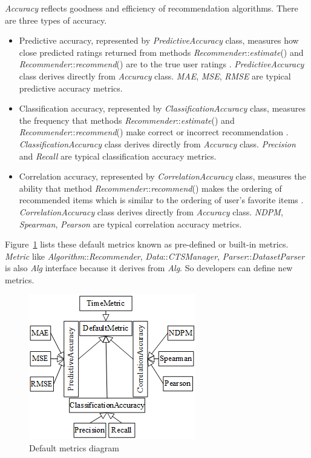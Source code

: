 \documentclass[a4paper,twoside]{article}
\begin{document}
\textit{Accuracy} reflects goodness and efficiency of recommendation algorithms. There are three types of accuracy.
\begin{itemize}
\item Predictive accuracy, represented by \textit{PredictiveAccuracy} class, measures how close predicted ratings returned from methods \textit{Recommender}::\textit{estimate}() and \textit{Recommender}::\textit{recommend}() are to the true user ratings \cite[pp. 20-21]{herlocker2004}. \textit{PredictiveAccuracy} class derives directly from \textit{Accuracy} class. \textit{MAE}, \textit{MSE}, \textit{RMSE} \cite[pp. 20-21]{herlocker2004} are typical predictive accuracy metrics.
\item Classification accuracy, represented by \textit{ClassificationAccuracy} class, measures the frequency that methods \textit{Recommender}::\textit{estimate}() and \textit{Recommender}::\textit{recommend}() make correct or incorrect recommendation \cite[pp. 20-22]{herlocker2004}. \textit{ClassificationAccuracy} class derives directly from \textit{Accuracy} class. \textit{Precision} and \textit{Recall} \cite[pp. 22-25]{herlocker2004} are typical classification accuracy metrics.
\item Correlation accuracy, represented by \textit{CorrelationAccuracy} class, measures the ability that method \textit{Recommender}::\textit{recommend}() makes the ordering of recommended items which is similar to the ordering of user's favorite items \cite[pp. 29-33]{herlocker2004}. \textit{CorrelationAccuracy} class derives directly from \textit{Accuracy} class. \textit{NDPM}, \textit{Spearman}, \textit{Pearson} \cite[pp. 29-33]{herlocker2004} are typical correlation accuracy metrics.
\end{itemize}
Figure~\ref{figure:default-metrics-diagram} lists these default metrics known as pre-defined or built-in metrics. \textit{Metric} like \textit{Algorithm}::\textit{Recommender}, \textit{Data}::\textit{CTSManager}, \textit{Parser}::\textit{DatasetParser} is also \textit{Alg} interface because it derives from \textit{Alg}. So developers can define new metrics.
\begin{figure}
\centering
\includegraphics{DefaultMetricsDiagram.png}
\caption{Default metrics diagram}
\label{figure:default-metrics-diagram}
\end{figure}
\end{document}
